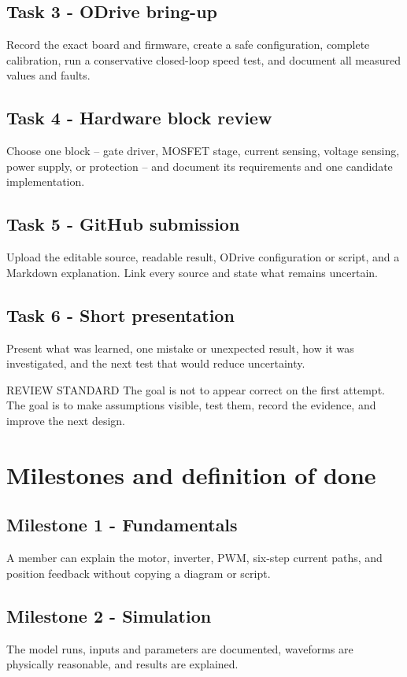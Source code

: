 \documentclass[11pt,a4paper]{article}
\begin{document}
\subsection{Task 3 - ODrive bring-up}
Record the exact board and firmware, create a safe configuration, complete
calibration, run a conservative closed-loop speed test, and document all
measured values and faults.

\subsection{Task 4 - Hardware block review}
Choose one block -- gate driver, MOSFET stage, current sensing, voltage
sensing, power supply, or protection -- and document its requirements and one
candidate implementation.

\subsection{Task 5 - GitHub submission}
Upload the editable source, readable result, ODrive configuration or script,
and a Markdown explanation. Link every source and state what remains
uncertain.

\subsection{Task 6 - Short presentation}
Present what was learned, one mistake or unexpected result, how it was
investigated, and the next test that would reduce uncertainty.

\begin{callout}{REVIEW STANDARD}
  The goal is not to appear correct on the first attempt. The goal is to make
  assumptions visible, test them, record the evidence, and improve the next
  design.
\end{callout}

\section{Milestones and definition of done}

\subsection{Milestone 1 - Fundamentals}
A member can explain the motor, inverter, PWM, six-step current paths, and
position feedback without copying a diagram or script.

\subsection{Milestone 2 - Simulation}
The model runs, inputs and parameters are documented, waveforms are physically
reasonable, and results are explained.
\end{document}
